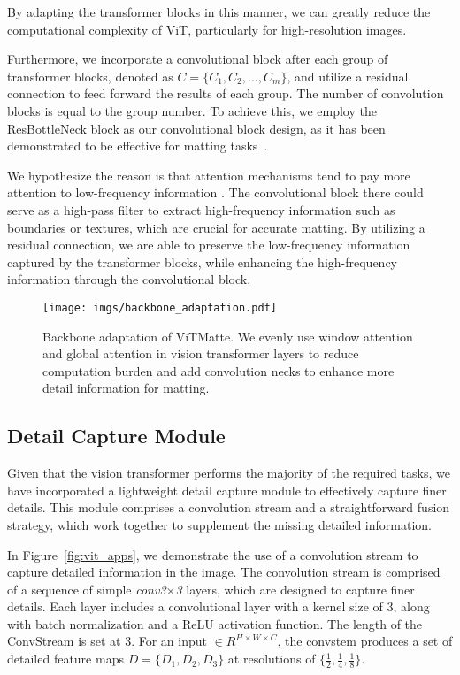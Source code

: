 \documentclass[10pt,twocolumn,letterpaper]{article}
\newcommand{\thename}{ViTMatte}
\begin{document}
By adapting the transformer blocks in this manner, we can greatly reduce the computational complexity of ViT, particularly for high-resolution images.

Furthermore, we incorporate a convolutional block after each group of transformer blocks, denoted as $C=\{C_1, C_2, ..., C_m \}$, and utilize a residual connection to feed forward the results of each group. The number of convolution blocks is equal to the group number. To achieve this, we employ the ResBottleNeck \cite{res} block as our convolutional block design, as it has been demonstrated to be effective for matting tasks~\cite{GCAMatting, MGM}.

We hypothesize the reason is that attention mechanisms tend to pay more attention to low-frequency information \cite{iformer}. The convolutional block there could serve as a high-pass filter to extract high-frequency information such as boundaries or textures, which are crucial for accurate matting. By utilizing a residual connection, we are able to preserve the low-frequency information captured by the transformer blocks, while enhancing the high-frequency information through the convolutional block.

\begin{figure}[tbp]
    \centering
    \texttt{[image: imgs/backbone\_adaptation.pdf]}
    \caption{Backbone adaptation of \thename{}. We evenly use window attention and global attention in vision transformer layers to reduce computation burden and add convolution necks to enhance more detail information for matting.}
    \label{fig:backbone_adaptation}
\end{figure}


\subsection{Detail Capture Module}
\label{Detail Capture Module}

Given that the vision transformer performs the majority of the required tasks, we have incorporated a lightweight detail capture module to effectively capture finer details. This module comprises a convolution stream and a straightforward fusion strategy, which work together to supplement the missing detailed information.

In Figure~\ref{fig:vit_apps}, we demonstrate the use of a convolution stream to capture detailed information in the image. The convolution stream is comprised of a sequence of simple \textit{conv3$\times$3} layers, which are designed to capture finer details. Each layer includes a convolutional layer with a kernel size of 3, along with batch normalization and a ReLU activation function. The length of the ConvStream is set at 3. For an input $\in R^{H\times W\times C}$, the convstem produces a set of detailed feature maps $D=\{D_1, D_2, D_3\}$ at resolutions of $\{\frac{1}{2}, \frac{1}{4}, \frac{1}{8} \}$.
\end{document}
